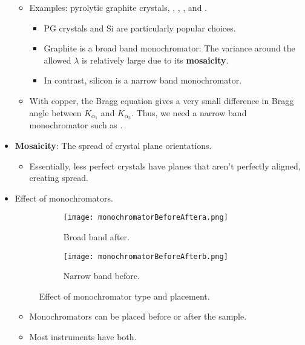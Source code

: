 \documentclass[../notes.tex]{subfiles}
\begin{document}
\begin{itemize}
\begin{itemize}
\begin{itemize}
        \end{itemize}
        \item Examples: pyrolytic graphite crystals, , , , and .
        \begin{itemize}
            \item PG crystals and Si are particularly popular choices.
            \item Graphite is a broad band monochromator: The variance around the allowed $\lambda$ is relatively large due to its \textbf{mosaicity}.
            \item In contrast, silicon is a narrow band monochromator.
        \end{itemize}
        \item With copper, the Bragg equation gives a very small difference in Bragg angle between $K_{\alpha_1}$ and $K_{\alpha_2}$. Thus, we need a narrow band monochromator such as .
    \end{itemize}
    \item \textbf{Mosaicity}: The spread of crystal plane orientations.
    \begin{itemize}
        \item Essentially, less perfect crystals have planes that aren't perfectly aligned, creating spread.
    \end{itemize}
    \item Effect of monochromators.
    \begin{figure}[h!]
        \centering
        \begin{subfigure}[b]{0.49\linewidth}
            \centering
            \texttt{[image: monochromatorBeforeAftera.png]}
            \caption{Broad band after.}
            \label{fig:monochromatorBeforeAftera}
        \end{subfigure}
        \begin{subfigure}[b]{0.49\linewidth}
            \centering
            \texttt{[image: monochromatorBeforeAfterb.png]}
            \caption{Narrow band before.}
            \label{fig:monochromatorBeforeAfterb}
        \end{subfigure}
        \caption{Effect of monochromator type and placement.}
        \label{fig:monochromatorBeforeAfter}
    \end{figure}
    \begin{itemize}
        \item Monochromators can be placed before or after the sample.
        \item Most instruments have both.

\end{itemize}
\end{itemize}
\end{document}
